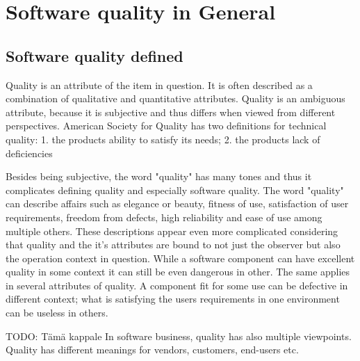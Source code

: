 \section{Software quality in General}
 
\subsection{Software quality defined}

Quality is an attribute of the item in question. It is often described as a combination of qualitative and quantitative attributes. Quality is an ambiguous attribute, because it is subjective and thus differs when viewed from different perspectives. American Society for Quality has two definitions for technical quality: 1. the products ability to satisfy its needs; 2. the products lack of deficiencies~\cite{ASQglossary}

Besides being subjective, the word "quality" has many tones and thus it complicates defining quality and especially software quality. The word "quality" can describe affairs such as elegance or beauty, fitness of use, satisfaction of user requirements, freedom from defects, high reliability and ease of use among multiple others. These descriptions appear even more complicated considering that quality and the it's attributes are bound to not just the observer but also the operation context in question. While a software component can have excellent quality in some context it can still be even dangerous in other. The same applies in several attributes of quality. A component fit for some use can be defective in different context; what is satisfying the users requirements in one environment can be useless in others.~\cite{jones2011economics}

TODO: Tämä kappale
In software business, quality has also multiple viewpoints. Quality has different meanings for vendors, customers, end-users etc. 




